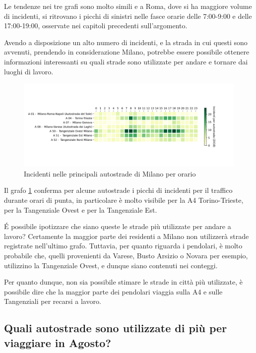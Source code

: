 \documentclass[a4paper,12pt]{report}
\begin{document}
Le tendenze nei tre grafi sono molto simili e a Roma, dove si ha maggiore 
volume di incidenti, si ritrovano i picchi di sinistri nelle fasce orarie delle 
7:00-9:00 e delle 17:00-19:00, osservate nei capitoli precedenti sull'argomento.


Avendo a disposizione un alto numero di incidenti, e la strada in cui questi sono 
avvenuti, prendendo in considerazione Milano, potrebbe essere possibile 
ottenere informazioni interessanti su quali strade sono utilizzate per 
andare e tornare dai luoghi di lavoro.

\begin{figure}
    \includegraphics[width=\linewidth]{../src/incidenti/incidenti_aci/orari/tangenziali_autostrade.png}
    \caption{Incidenti nelle principali autostrade di Milano per orario}
    \label{fig:tangenziali-autostrade}
\end{figure}

Il grafo \ref{fig:tangenziali-autostrade} conferma per alcune autostrade i picchi di 
incidenti per il traffico durante orari di punta, in particolare è molto visibile 
per la A4 Torino-Trieste, per la Tangenziale Ovest e per la Tangenziale Est.

\'E possibile ipotizzare che siano queste le strade più utilizzate per 
andare a lavoro? 
Certamente la maggior parte dei residenti a Milano non utilizzerà strade registrate 
nell'ultimo grafo. 
Tuttavia, per quanto riguarda i pendolari, è molto probabile che, quelli provenienti 
da Varese, Busto Arsizio o Novara per esempio, utilizzino la Tangenziale Ovest, 
e dunque siano contenuti nei conteggi. 

Per quanto dunque, non sia possibile stimare le strade in città più utilizzate, 
è possibile dire che la maggior parte dei pendolari viaggia sulla A4 e sulle 
Tangenziali per recarsi a lavoro.

\subsection{Quali autostrade sono utilizzate di più per viaggiare in Agosto?}
\end{document}
